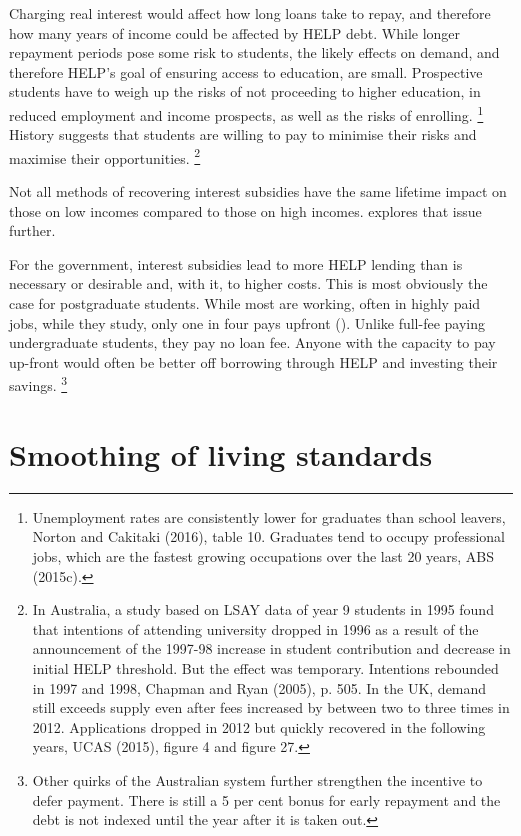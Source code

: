 \documentclass[embargoed]{grattan}
\begin{document}
{Charging real interest would affect how long loans take to repay, and therefore how many years of income could be affected by \gls{HELP} debt.
While longer repayment periods pose some risk to students, the likely effects on demand, and therefore \gls{HELP}'s goal of ensuring access to education, are small.
Prospective students have to weigh up the risks of not proceeding to higher education, in reduced employment and income prospects, as well as the risks of enrolling.%
\footnote{Unemployment rates are consistently lower for graduates than school leavers, Norton and Cakitaki (2016), table 10.
Graduates tend to occupy professional jobs, which are the fastest growing occupations over the last 20 years, ABS (2015c).} History suggests that students are willing to pay to minimise their risks and maximise their opportunities.%
\footnote{In Australia, a study based on LSAY data of year 9 students in 1995 found that intentions of attending university dropped in 1996 as a result of the announcement of the 1997-98 increase in student contribution and decrease in initial \gls{HELP} threshold.
But the effect was temporary.
Intentions rebounded in 1997 and 1998, Chapman and Ryan (2005), p. 505.
In the UK, demand still exceeds supply even after fees increased by between two to three times in 2012.
Applications dropped in 2012 but quickly recovered in the following years, UCAS (2015), figure 4 and figure 27.}

Not all methods of recovering interest subsidies have the same lifetime impact on those on low incomes compared to those on high incomes.
 explores that issue further.

For the government, interest subsidies lead to more \gls{HELP} lending than is necessary or desirable and, with it, to higher costs.
This is most obviously the case for postgraduate students.
While most are working, often in highly paid jobs, while they study, only one in four pays upfront ().
Unlike full-fee paying undergraduate students, they pay no loan fee.
Anyone with the capacity to pay up-front would often be better off borrowing through \gls{HELP} and investing their savings.%
\footnote{Other quirks of the Australian system further strengthen the incentive to defer payment.
There is still a 5 per cent bonus for early repayment and the debt is not indexed until the year after it is taken out.}

\section{Smoothing of living standards}\label{smoothing-of-living-standards}

}
\end{document}
